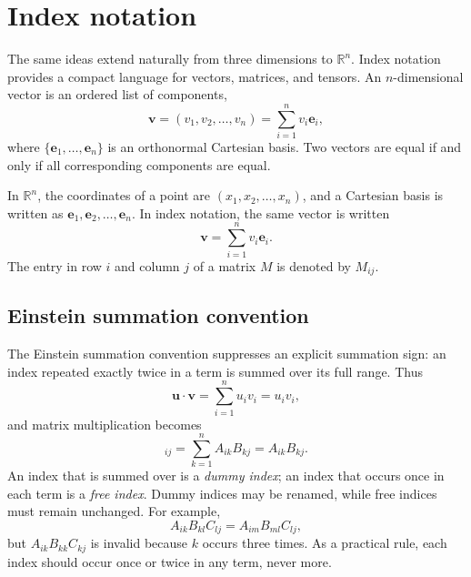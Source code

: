 \section{Index notation}
The same ideas extend naturally from three dimensions to $\mathbb{R}^n$. Index notation provides a compact language for vectors, matrices, and tensors. An $n$-dimensional vector is an ordered list of components,
\begin{equation}
    \mathbf{v}=(v_1,v_2,\ldots,v_n)
    =\sum_{i=1}^{n}v_i\mathbf{e}_i,
\end{equation}
where $\{\mathbf{e}_1,\ldots,\mathbf{e}_n\}$ is an orthonormal Cartesian basis. Two vectors are equal if and only if all corresponding components are equal.

In $\mathbb{R}^n$, the coordinates of a point are $(x_1,x_2,\ldots,x_n)$, and a Cartesian basis is written as $\mathbf{e}_1,\mathbf{e}_2,\ldots,\mathbf{e}_n$. In index notation, the same vector is written
\begin{equation}
\mathbf{v}=\sum_{i=1}^{n}v_i\mathbf{e}_i.
\end{equation}
The entry in row $i$ and column $j$ of a matrix $M$ is denoted by $M_{ij}$.

\subsection{Einstein summation convention}
The Einstein summation convention suppresses an explicit summation sign: an index repeated exactly twice in a term is summed over its full range. Thus
\begin{equation}
\mathbf{u}\cdot\mathbf{v}=\sum_{i=1}^{n}u_iv_i=u_iv_i,
\end{equation}
and matrix multiplication becomes
\begin{equation}
[AB]_{ij}=\sum_{k=1}^{n}A_{ik}B_{kj}=A_{ik}B_{kj}.
\end{equation}
An index that is summed over is a \emph{dummy index}; an index that occurs once in each term is a \emph{free index}. Dummy indices may be renamed, while free indices must remain unchanged. For example,
\begin{equation}
A_{ik}B_{kl}C_{lj}=A_{im}B_{ml}C_{lj},
\end{equation}
but $A_{ik}B_{kk}C_{kj}$ is invalid because $k$ occurs three times. As a practical rule, each index should occur once or twice in any term, never more.


